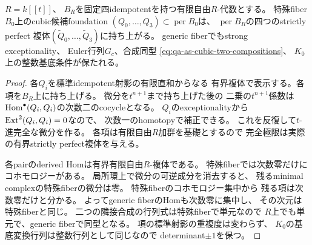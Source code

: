 \begin{lemma}
\label{lem:qa-as-cubic-perfect-lifting}
$R=k[[t]]$、
$B_R$を固定四idempotentを持つ有限自由$R$-代数とする。
特殊fiber$B_0$上のcubic候補foundation
$(Q_0,\ldots,Q_3)\subset\operatorname{per}B_0$は、
$\operatorname{per}B_R$の四つのstrictly perfect
複体$(\widetilde Q_0,\ldots,\widetilde Q_3)$に持ち上がる。
generic fiberでもstrong exceptionality、
Euler行列$G_c$、合成同型
\eqref{eq:qa-as-cubic-two-compositions}、
$K_0$上の整数基底条件が保たれる。
\end{lemma}
\begin{proof}
各$Q_i$を標準idempotent射影の有限直和からなる
有界複体で表示する。各項を$B_R$上に持ち上げる。
微分を$t^{n+1}$まで持ち上げた後の
二乗の$t^{n+1}$係数は
$\operatorname{Hom}^\bullet(Q_i,Q_i)$の次数二のcocycleとなる。
$Q_i$のexceptionalityから$\operatorname{Ext}^2(Q_i,Q_i)=0$なので、
次数一のhomotopyで補正できる。
これを反復して$t$-進完全な微分を作る。
各項は有限自由$R$加群を基礎とするので
完全極限は実際の有界strictly perfect複体を与える。

各pairのderived Homは有界有限自由$R$-複体である。
特殊fiberでは次数零だけにコホモロジーがある。
局所環上で微分の可逆成分を消去すると、
残るminimal complexの特殊fiberの微分は零。
特殊fiberのコホモロジー集中から
残る項は次数零だけと分かる。
よってgeneric fiberのHomも次数零に集中し、
その次元は特殊fiberと同じ。
二つの隣接合成の行列式は特殊fiberで単元なので
$R$上でも単元で、generic fiberで同型となる。
項の標準射影の重複度は変わらず、
$K_0$の基底変換行列は整数行列として同じなので
determinant$\pm1$を保つ。
\end{proof}

